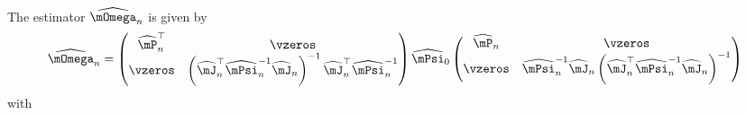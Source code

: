 \documentclass[english,12pt]{book}\usepackage[]{graphicx}\usepackage[]{xcolor}
\begin{document}
The estimator $\widehat{\mOmega}_n$ is given by
\begin{equation}\label{eq:Omega-sarar-gsls}
\widehat{\mOmega}_n = \begin{pmatrix}
                      \widehat{\mP}_n^\top & \vzeros \\
                      \vzeros  & \left(\widehat{\mJ}_n^\top\widehat{\mPsi}_n^{-1}\widehat{\mJ}_n\right)^{-1}\widehat{\mJ}^\top_n\widehat{\mPsi}^{-1}_n
                     \end{pmatrix}
                     \widehat{\mPsi}_0
                     \begin{pmatrix}
                      \widehat{\mP}_n & \vzeros \\
                      \vzeros  & \widehat{\mPsi}^{-1}_n\widehat{\mJ}_n\left(\widehat{\mJ}_n^\top\widehat{\mPsi}_n^{-1}\widehat{\mJ}_n\right)^{-1}
                     \end{pmatrix}
\end{equation}
%
with
\end{document}

